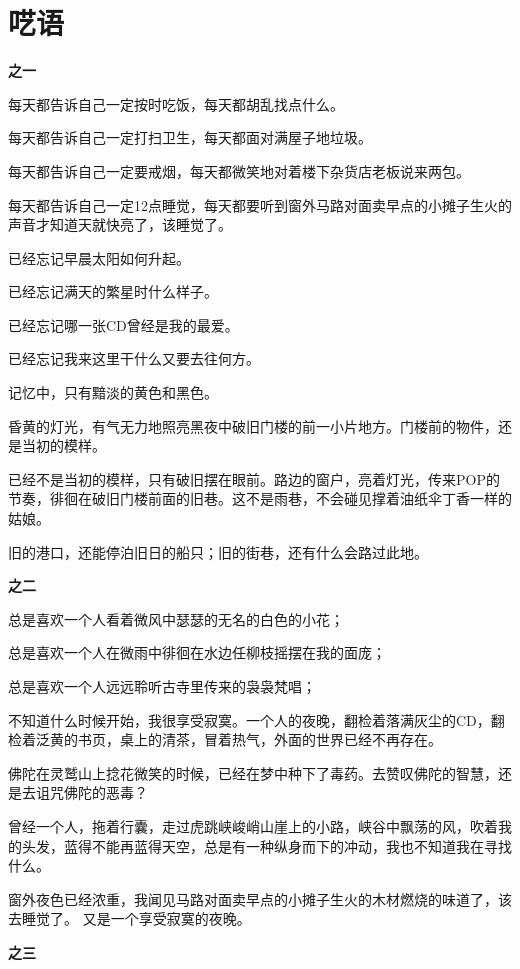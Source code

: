 \section{呓语}
	
\textbf{之一}

\pskip	
每天都告诉自己一定按时吃饭，每天都胡乱找点什么。
	
每天都告诉自己一定打扫卫生，每天都面对满屋子地垃圾。
	
每天都告诉自己一定要戒烟，每天都微笑地对着楼下杂货店老板说来两包。
	
每天都告诉自己一定12点睡觉，每天都要听到窗外马路对面卖早点的小摊子生火的声音才知道天就快亮了，该睡觉了。

\pskip	
已经忘记早晨太阳如何升起。

已经忘记满天的繁星时什么样子。

已经忘记哪一张CD曾经是我的最爱。

已经忘记我来这里干什么又要去往何方。

\pskip
记忆中，只有黯淡的黄色和黑色。

昏黄的灯光，有气无力地照亮黑夜中破旧门楼的前一小片地方。门楼前的物件，还是当初的模样。

已经不是当初的模样，只有破旧摆在眼前。路边的窗户，亮着灯光，传来POP的节奏，徘徊在破旧门楼前面的旧巷。这不是雨巷，不会碰见撑着油纸伞丁香一样的姑娘。

旧的港口，还能停泊旧日的船只；旧的街巷，还有什么会路过此地。

\pskip	
\textbf{之二}

\pskip
总是喜欢一个人看着微风中瑟瑟的无名的白色的小花；

总是喜欢一个人在微雨中徘徊在水边任柳枝摇摆在我的面庞；

总是喜欢一个人远远聆听古寺里传来的袅袅梵唱；

\pskip
不知道什么时候开始，我很享受寂寞。一个人的夜晚，翻检着落满灰尘的CD，翻检着泛黄的书页，桌上的清茶，冒着热气，外面的世界已经不再存在。

佛陀在灵鹫山上捻花微笑的时候，已经在梦中种下了毒药。去赞叹佛陀的智慧，还是去诅咒佛陀的恶毒？

曾经一个人，拖着行囊，走过虎跳峡峻峭山崖上的小路，峡谷中飘荡的风，吹着我的头发，蓝得不能再蓝得天空，总是有一种纵身而下的冲动，我也不知道我在寻找什么。

\pskip
窗外夜色已经浓重，我闻见马路对面卖早点的小摊子生火的木材燃烧的味道了，该去睡觉了。
又是一个享受寂寞的夜晚。

\pskip
\textbf{之三}


